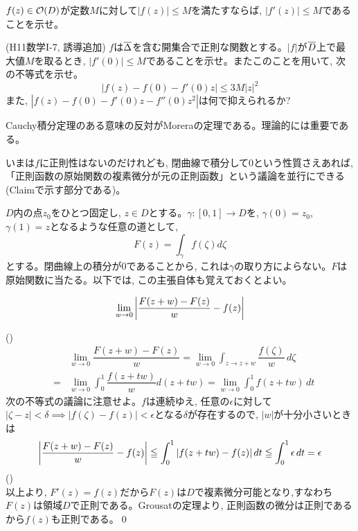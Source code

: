 \begin{prac}
$f(z)\in \mathcal{O}(D)$が定数$M$に対して$|f(z)|\leq M$を満たすならば, $|f'(z)|\leq M$であることを示せ。
\end{prac}

\begin{prac} (H11数学I-7, 誘導追加)
$f$は$\overline{\Delta}$を含む開集合で正則な関数とする。$|f|$が$\overline{D}$上で最大値$M$を取るとき, $|f'(0)| \leq M$であることを示せ。またこのことを用いて, 次の不等式を示せ。
\[|f(z) - f(0) - f'(0)z| \leq 3M|z|^2\]
また, $|f(z) - f(0) - f'(0)z - f''(0)z^2|$は何で抑えられるか?
\end{prac}

Cauchy積分定理のある意味の反対がMoreraの定理である。理論的には重要である。
\begin{point}
\ben
\item いまは$f$に正則性はないのだけれども, 閉曲線で積分して0という性質さえあれば, 「正則函数の原始関数の複素微分が元の正則函数」という議論を並行にできる(Claimで示す部分である)。
\een
\end{point}
\prf $D$内の点$z_0$をひとつ固定し, $z\in D$とする。$\gamma:[0,1]\to D$を, $\gamma(0) = z_0$, $\gamma(1) = z$となるような任意の道として,
\[F(z) = \int_{\gamma} f(\zeta)d\zeta\]
とする。閉曲線上の積分が0であることから, これは$\gamma$の取り方によらない。$F$は原始関数に当たる。以下では, この主張自体も覚えておくとよい。
\begin{claim}
\[\lim_{w\to 0} \left| \dfrac{F(z+w) - F(z)}{w} - f(z) \right|\]
\end{claim}
()
\begin{eqnarray}
&&\lim_{w\to 0} \dfrac{F(z+w) - F(z)}{w} = \lim_{w\to 0} \int_{z\to z+w} \dfrac{f(\zeta)}{w}\, d\zeta \\
&=&  \lim_{w\to 0} \int_{0}^{1} \dfrac{f(z+tw)}{w} d(z+tw) = \lim_{w\to 0} \int_{0}^{1} f(z+tw)\, dt
\end{eqnarray}
次の不等式の議論に注意せよ。$f$は連続ゆえ, 任意の$\epsilon$に対して$|\zeta - z| < \delta\implies |f(\zeta) - f(z)| < \epsilon$となる$\delta$が存在するので, $|w|$が十分小さいときは
\begin{eqnarray}
\left| \dfrac{F(z+w) - F(z)}{w} - f(z) \right| \leqq \int_{0}^{1} |f(z+tw) - f(z)|\, dt \leqq \int_{0}^{1} \epsilon \, dt = \epsilon
\end{eqnarray}
()\\
以上より, $F'(z) = f(z)$だから$F(z)$は$D$で複素微分可能となり,すなわち $F(z)$は領域$D$で正則である。Grousatの定理より, 正則函数の微分は正則であるから$f(z)$も正則である。\qed

